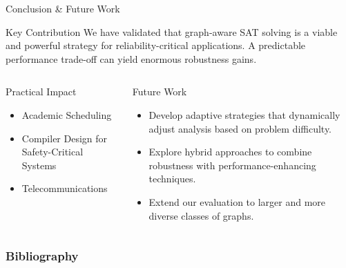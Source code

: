 \documentclass[11pt]{beamer}
\begin{document}
\begin{frame}{Conclusion \& Future Work}
    \begin{block}{Key Contribution}
        We have validated that graph-aware SAT solving is a viable and powerful strategy for reliability-critical applications. A predictable performance trade-off can yield enormous robustness gains.
    \end{block}
    \begin{columns}[T]
        \begin{column}{0.5\textwidth}
            \begin{exampleblock}{Practical Impact}
                \begin{itemize}
                    \item Academic Scheduling
                    \item Compiler Design for Safety-Critical Systems
                    \item Telecommunications
                \end{itemize}
            \end{exampleblock}
        \end{column}
        \begin{column}{0.5\textwidth}
            \begin{block}{Future Work}
                \begin{itemize}
                    \item Develop adaptive strategies that dynamically adjust analysis based on problem difficulty.
                    \item Explore hybrid approaches to combine robustness with performance-enhancing techniques.
                    \item Extend our evaluation to larger and more diverse classes of graphs.
                \end{itemize}
            \end{block}
        \end{column}
    \end{columns}
\end{frame}

\begin{frame}[t,allowframebreaks]
\frametitle{Bibliography}
\printbibliography
\end{frame}
\end{document}
